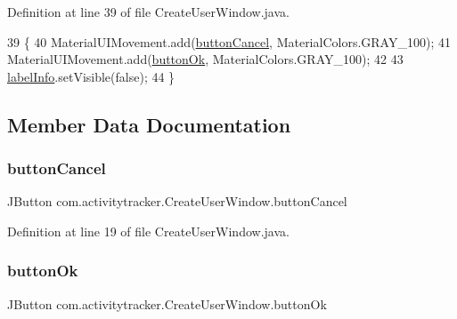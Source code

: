 Definition at line 39 of file Create\+User\+Window.\+java.


\begin{DoxyCode}
39                            \{
40         MaterialUIMovement.add(\mbox{\hyperlink{classcom_1_1activitytracker_1_1_create_user_window_a975a5cc35d145a3efa4d9e340776ca63}{buttonCancel}}, MaterialColors.GRAY\_100);
41         MaterialUIMovement.add(\mbox{\hyperlink{classcom_1_1activitytracker_1_1_create_user_window_aa22864c8baa65b46fe9a7621748d7841}{buttonOk}}, MaterialColors.GRAY\_100);
42 
43         \mbox{\hyperlink{classcom_1_1activitytracker_1_1_create_user_window_a09fb943f56852bc4a8dbd32b7dbe8afc}{labelInfo}}.setVisible(\textcolor{keyword}{false});
44     \}
\end{DoxyCode}


\subsection{Member Data Documentation}
\mbox{\label{classcom_1_1activitytracker_1_1_create_user_window_a975a5cc35d145a3efa4d9e340776ca63}} 
\subsubsection{\texorpdfstring{button\+Cancel}{buttonCancel}}
{\footnotesize\ttfamily J\+Button com.\+activitytracker.\+Create\+User\+Window.\+button\+Cancel\hspace{0.3cm}{\ttfamily [private]}}



Definition at line 19 of file Create\+User\+Window.\+java.

\mbox{\label{classcom_1_1activitytracker_1_1_create_user_window_aa22864c8baa65b46fe9a7621748d7841}} 
\subsubsection{\texorpdfstring{button\+Ok}{buttonOk}}
{\footnotesize\ttfamily J\+Button com.\+activitytracker.\+Create\+User\+Window.\+button\+Ok\hspace{0.3cm}{\ttfamily [private]}}



